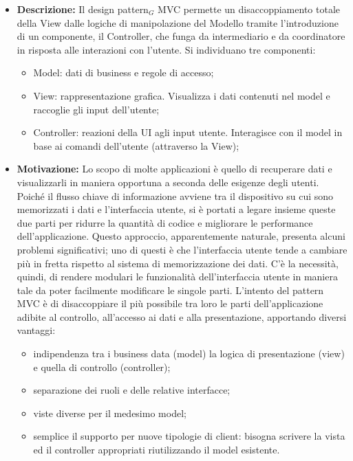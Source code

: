 \begin{itemize}
\item \textbf{Descrizione:} Il design pattern$_G$ MVC permette un disaccoppiamento totale della View dalle logiche di manipolazione del Modello tramite l’introduzione di un componente, il Controller, che funga da intermediario e da coordinatore in risposta alle interazioni con l’utente. Si individuano tre componenti:

\begin{itemize}
\item Model: dati di business e regole di accesso;
\item View: rappresentazione grafica. Visualizza i dati contenuti nel model e raccoglie gli input dell’utente;
\item Controller: reazioni della UI agli input utente. Interagisce con il model in base ai comandi dell'utente (attraverso la View);
\end{itemize}

\item \textbf{Motivazione:}  Lo scopo di molte applicazioni è quello di recuperare dati e visualizzarli in maniera opportuna a seconda delle esigenze degli utenti. Poiché il flusso chiave di informazione avviene tra il dispositivo su cui sono memorizzati i dati e l'interfaccia utente, si è portati a legare insieme queste due parti per ridurre la quantità di codice e migliorare le performance dell'applicazione. 
Questo approccio, apparentemente naturale, presenta alcuni problemi significativi; uno di questi è che l'interfaccia utente tende a cambiare più in fretta rispetto al sistema di memorizzazione dei dati. 
C'è la necessità, quindi, di rendere modulari le funzionalità dell'interfaccia utente in maniera tale da poter facilmente modificare le singole parti. 
L'intento del pattern MVC è di disaccoppiare il più possibile tra loro le parti dell'applicazione adibite al controllo, all'accesso ai dati e alla presentazione, apportando diversi vantaggi:

\begin{itemize}
\item indipendenza tra i business data (model) la logica di presentazione (view) e quella di controllo (controller);
\item separazione dei ruoli e delle relative interfacce;
\item viste diverse per il medesimo model;
\item semplice il supporto per nuove tipologie di client: bisogna scrivere la vista ed il controller appropriati riutilizzando il model esistente.
\end{itemize}


\end{itemize}
